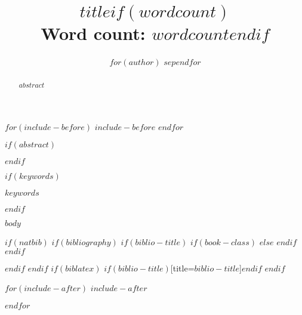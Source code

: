 \documentclass[$for(classoption)$$classoption$$sep$,$endfor$]{glossa}
\title[$if(shorttitle)$$shorttitle$$endif$]{$title$$if(wordcount)$\\ \bigskip \large Word count: $wordcount$$endif$}
\author[$if(shortauthors)$$shortauthors$$endif$]{
  $for(author)$
  \spauthor{$author.name$\\
  \institute{$author.affiliation$}\\
  \small{$author.address$}
  }%
  $sep$\AND$endfor$
}
\begin{document}
$for(include-before)$
$include-before$
$endfor$

\sffamily
\maketitle

$if(abstract)$
\begin{abstract}
$abstract$
\end{abstract}
$endif$

$if(keywords)$
\begin{keywords}
  $keywords$
\end{keywords}
$endif$

\rmfamily

$body$

$if(natbib)$
$if(bibliography)$
$if(biblio-title)$
$if(book-class)$
\renewcommand\bibname{$biblio-title$}
$else$
\renewcommand\refname{$biblio-title$}
$endif$
$endif$

$endif$
$endif$
$if(biblatex)$
\printbibliography$if(biblio-title)$[title=$biblio-title$]$endif$
$endif$

$for(include-after)$
$include-after$

$endfor$
\end{document}
